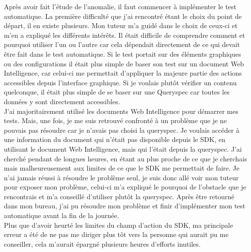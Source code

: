 Apr\`{e}s avoir fait l'\'{e}tude de l'anomalie, il faut commencer \`{a} impl\'{e}menter le test automatique. La premi\`{e}re difficult\'{e} que j'ai rencontr\'{e} \'{e}tant le choix du point de d\'{e}part, il en existe plusieurs. Mon tuteur m'a guid\'{e} dans le choix de ceux-ci et m'en a expliqu\'{e} les diff\'{e}rents int\'{e}r\^{e}ts. Il \'{e}tait difficile de comprendre comment et pourquoi utiliser l'un ou l'autre car cela d\'{e}pendait directement de ce qui devait \^{e}tre fait dans le test automatique. Si le test portait sur des \'{e}l\'{e}ments graphiques ou des configurations il \'{e}tait plus simple de baser son test sur un document Web Intelligence, car celui-ci me permettait d'appliquer la majeure partie des actions accessibles depuis l'interface graphique. Si je voulais plut\^{o}t v\'{e}rifier un contenu quelconque, il \'{e}tait plus simple de se baser sur une \gls{Queryspec} car toutes les donn\'{e}es y sont directement accessibles. \\

J'ai majoritairement utilis\'{e} les documents Web Intelligence pour d\'{e}marrer mes tests. Mais, une fois, je me suis retrouv\'{e} confront\'{e} \`{a} un probl\`{e}me que je ne pouvais pas r\'{e}soudre car je n'avais pas choisi la queryspec. Je voulais acc\'{e}der \`{a} une information du document qui n'\'{e}tait pas disponible depuis le \gls{SDK}, en utilisant le document Web Intelligence, mais qui l'\'{e}tait depuis la queryspec. J'ai cherch\'{e} pendant de longues heures, en \'{e}tant au plus proche de ce que je cherchais mais malheureusement aux limites de ce que le \gls{SDK} me permettait de faire. Je n'ai jamais r\'{e}ussi \`{a} r\'{e}soudre le probl\`{e}me seul, je suis donc all\'{e} voir mon tuteur pour exposer mon probl\`{e}me, celui-ci m'a expliqu\'{e} le pourquoi de l'obstacle que je rencontrais et m'a conseill\'{e} d'utiliser plut\^{o}t la queryspec. Apr\`{e}s \^{e}tre retourn\'{e} dans mon bureau, j'ai pu r\'{e}soudre mon probl\`{e}me et finir d'impl\'{e}menter mon test automatique avant la fin de la journ\'{e}e.\\

Plus que d'avoir heurt\'{e} les limites du champ d'action du \gls{SDK}, ma principale erreur a \'{e}t\'{e} de ne pas me diriger plus t\^{o}t vers la personne qui aurait pu me conseiller, cela m'aurait \'{e}pargn\'{e} plusieurs heures d'efforts inutiles.\\

